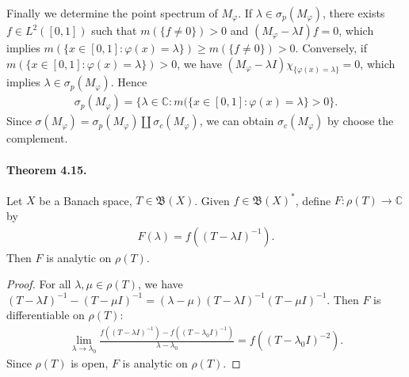 \documentclass{article}
\begin{document}
Finally we determine the point spectrum of $M_\varphi$. If $\lambda\in\sigma_p(M_\varphi)$, there exists $f\in L^2([0,1])$ such that $m(\{f\neq 0\})>0$ and $(M_\varphi - \lambda I)f=0$, which implies $m(\{x\in[0,1]:\varphi(x)=\lambda\})\geq m(\{f\neq 0\})>0$. Conversely, if $m(\{x\in[0,1]:\varphi(x)=\lambda\})>0$, we have $(M_\varphi-\lambda I)\chi_{\{\varphi(x)=\lambda\}} = 0$, which implies $\lambda\in\sigma_p(M_\varphi)$. Hence 
\begin{align*}
	\sigma_p(M_\varphi)=\{\lambda\in\mathbb{C}:m(\{x\in[0,1]:\varphi(x)=\lambda\}>0\}.
\end{align*}
Since $\sigma(M_\varphi)=\sigma_p(M_\varphi)\amalg\sigma_c(M_\varphi)$, we can obtain $\sigma_c(M_\varphi)$ by choose the complement.

\paragraph{Theorem 4.15.\label{thm:4.15}} Let $X$ be a Banach space, $T\in\mathfrak{B}(X)$. Given $f\in\mathfrak{B}(X)^*$, define $F:\rho(T)\to\mathbb{C}$ by
\begin{align*}
	F(\lambda) = f\left((T-\lambda I)^{-1}\right).
\end{align*}
Then $F$ is analytic on $\rho(T)$.
\begin{proof}
For all $\lambda,\mu\in\rho(T)$, we have $(T-\lambda I)^{-1} - (T-\mu I)^{-1} = (\lambda-\mu)(T-\lambda I)^{-1}(T-\mu I)^{-1}$. Then $F$ is differentiable on $\rho(T)$:
\begin{align*}
	\lim_{\lambda\to\lambda_0} \frac{f\left((T-\lambda I)^{-1}\right)-f\left((T-\lambda_0 I)^{-1}\right)}{\lambda-\lambda_0} = f\left((T-\lambda_0 I)^{-2}\right).
\end{align*}
Since $\rho(T)$ is open, $F$ is analytic on $\rho(T)$. 
\end{proof}
\end{document}

